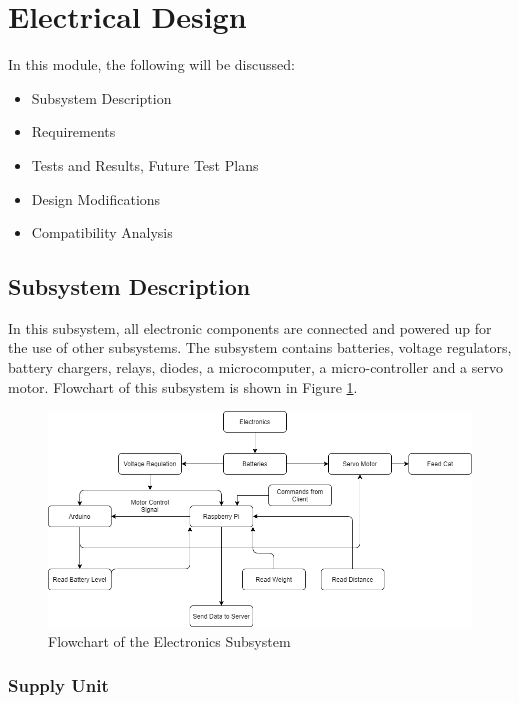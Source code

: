 \section{Electrical Design}
\label{sec:electrical_design}

In this module, the following will be discussed:
\begin{itemize}
\item Subsystem Description
\item Requirements
\item Tests and Results, Future Test Plans
\item Design Modifications
\item Compatibility Analysis
\end{itemize}

\subsection{Subsystem Description}
In this subsystem, all electronic components are connected and powered up for the use of other subsystems. The subsystem contains batteries, voltage regulators, battery chargers, relays, diodes, a microcomputer, a micro-controller and a servo motor. Flowchart of this subsystem is shown in Figure \ref{fig:flowelec}. 

\begin{figure}[h!]
     \centering
     \includegraphics[width=1.1\columnwidth]{content/050_electrical_design/elektronikflow.png}
     \caption{ Flowchart of the Electronics Subsystem}
     \label{fig:flowelec}
\end{figure}

\subsubsection{Supply Unit} 

